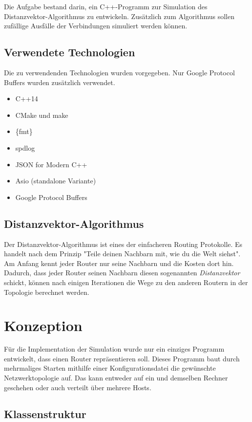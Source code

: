 \documentclass[a4paper,ngerman]{article}
\begin{document}
Die Aufgabe bestand darin, ein C++-Programm zur Simulation des Distanzvektor-Algorithmus zu entwickeln. Zusätzlich zum Algorithmus sollen zufällige Ausfälle der Verbindungen simuliert werden können.

\subsection{Verwendete Technologien}

Die zu verwendenden Technologien wurden vorgegeben. Nur Google Protocol Buffers wurden zusätzlich verwendet.

\begin{itemize}
    \item C++14
    \item CMake und make
    \item \{fmt\}
    \item spdlog
    \item JSON for Modern C++
    \item Asio (standalone Variante)
    \item Google Protocol Buffers
\end{itemize}

\subsection{Distanzvektor-Algorithmus}

Der Distanzvektor-Algorithmus ist eines der einfacheren Routing Protokolle. Es handelt nach dem Prinzip "Teile deinen Nachbarn mit, wie du die Welt siehst". Am Anfang kennt jeder Router nur seine Nachbarn und die Kosten dort hin. Dadurch, dass jeder Router seinen Nachbarn diesen sogenannten \textit{Distanzvektor} schickt, können nach einigen Iterationen die Wege zu den anderen Routern in der Topologie berechnet werden.

\section{Konzeption}

Für die Implementation der Simulation wurde nur ein einziges Programm entwickelt, dass einen Router repräsentieren soll. Dieses Programm baut durch mehrmaliges Starten mithilfe einer Konfigurationsdatei die gewünschte Netzwerktopologie auf. Das kann entweder auf ein und demselben Rechner geschehen oder auch verteilt über mehrere Hosts.

\subsection{Klassenstruktur}
\end{document}
